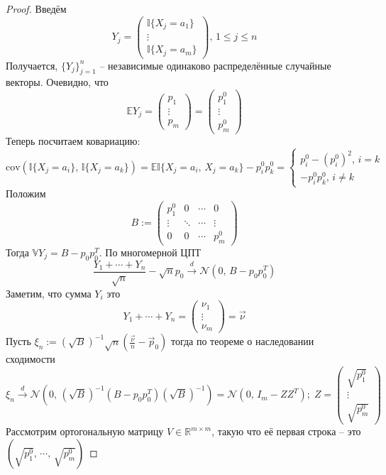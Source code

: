 \documentclass[a4paper,12pt]{article}
\renewcommand{\leq}{\ensuremath{\leqslant}}
\theoremstyle{plain}
\theoremstyle{definition}
\theoremstyle{remark}
\begin{document}
\begin{proof}
  Введём
  \[
    Y_j = \begin{pmatrix}
      \mathbb{I}\{X_j = a_1\}\\
      \vdots\\
      \mathbb{I}\{X_j = a_m\}
    \end{pmatrix},\, 1 \leq j \leq n
  \]
  Получается, $\{Y_j\}_{j = 1}^n$ -- независимые одинаково распределённые случайные векторы. Очевидно, что
  \[
    \mathbb{E}Y_j = \begin{pmatrix}
      p_1\\
      \vdots\\
      p_m
    \end{pmatrix} = \begin{pmatrix}
      p_1^0\\
      \vdots\\
      p_m^0
    \end{pmatrix}
  \]
  Теперь посчитаем ковариацию:
  \[
    \text{cov}(\mathbb{I}\{X_j = a_i\},\, \mathbb{I}\{X_j = a_k\}) = \mathbb{E}\mathbb{I}\{X_j = a_i,\, X_j = a_k\} - p_i^0p_k^0 = \begin{cases}
      p_i^0 - (p_i^0)^2,\, i = k\\
      -p_i^0p_k^0,\, i \neq k
    \end{cases}
  \]
  Положим
  \[
    B := \begin{pmatrix}
      p_1^0 & 0 & \cdots & 0\\
      \vdots & \ddots & \cdots & \vdots\\
      0 & 0 & \cdots & p_m^0
    \end{pmatrix}
  \]
  Тогда $\mathbb{V}Y_j = B - p_0p_0^T$. По многомерной ЦПТ 
  \[
    \frac{Y_1 + \cdots + Y_n}{\sqrt{n}} - \sqrt{n}p_0 \overset{d}{\to} \mathcal{N}(0,\, B - p_0p_0^T)
  \]
  Заметим, что сумма $Y_i$ это
  \[
    Y_1 + \cdots + Y_n = \begin{pmatrix}
      \nu_1\\
      \vdots\\
      \nu_m
    \end{pmatrix} = \vec{\nu}
  \]
  Пусть $\xi_n := (\sqrt{B})^{-1}\sqrt{n}\left(\frac{\vec{\nu}}{n} - \vec{p}_0\right)$ тогда по теореме о наследовании сходимости
  \[
    \xi_n \overset{d}{\to} \mathcal{N}\left(0,\,(\sqrt{B})^{-1}(B - p_0p_0^T)(\sqrt{B})^{-1}\right) = \mathcal{N}(0,\,I_m - ZZ^T);\; Z = \begin{pmatrix}
      \sqrt{p_1^0}\\
      \vdots\\
      \sqrt{p_m^0}
    \end{pmatrix}
  \]
  Рассмотрим ортогональную матрицу $V \in \mathbb{R}^{m \times m}$, такую что её первая строка -- это $(\sqrt{p_1^0},\,\cdots,\,\sqrt{p_m^0})$
  

\end{proof}
\end{document}
